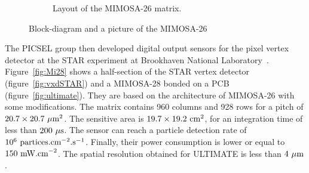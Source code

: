 \begin{figure}[!tbh]
\begin{subfigure}[t]{0.4\textwidth}
        \caption{Layout of the MIMOSA-26 matrix.}
        \label{fig:archMi26}
    \end{subfigure}
    \caption{Block-diagram and a picture of the MIMOSA-26}\label{fig:Mi26}
    \end{figure}    

    The PICSEL group then developed digital output sensors for the pixel vertex detector at the STAR experiment at Brookhaven National Laboratory~\cite{1748-0221-7-01-C01102}\cite{1748-0221-10-03-C03026}.
    Figure~\ref{fig:Mi28} shows a half-section of the STAR vertex detector (figure~\ref{fig:vxdSTAR}) and a \gls{MIMOSA}-28 bonded on a PCB (figure~\ref{fig:ultimate}).
    They are based on the architecture of \gls{MIMOSA}-26 with some modifications.
    The matrix contains 960 columns and 928 rows for a pitch of $20.7 \times 20.7~\rm{\mu m}^2$.
    The sensitive area is $19.7 \times 19.2~\rm{cm}^2$, for an integration time of less than $200~\rm{\mu s}$.
    The sensor can reach a particle detection rate of $10^6~\rm{partices.cm}^{-2}\rm{.s}^{-1}$. 
    Finally, their power consumption is lower or equal to $150~\rm{mW.cm}^{-2}$.
    The spatial resolution obtained for ULTIMATE is less than $4~\rm{\mu m}$.

